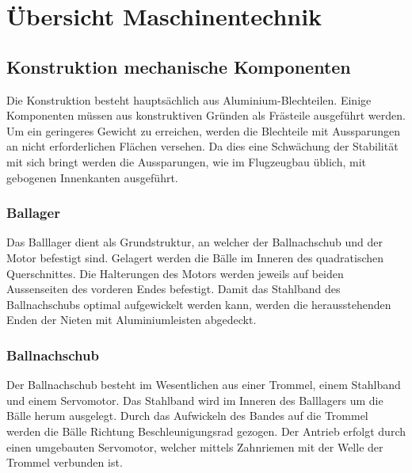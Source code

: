 \section{Übersicht Maschinentechnik}
\subsection{Konstruktion mechanische Komponenten}
Die Konstruktion besteht hauptsächlich aus Aluminium-Blechteilen. Einige 
Komponenten müssen aus konstruktiven Gründen als Frästeile ausgeführt werden.
Um ein geringeres Gewicht zu 
erreichen, werden die Blechteile mit Aussparungen an nicht erforderlichen 
Flächen versehen. Da dies eine Schwächung der Stabilität mit sich bringt werden die Aussparungen, wie im Flugzeugbau üblich, mit gebogenen Innenkanten ausgeführt. 

\subsubsection{Ballager}
Das Balllager dient als Grundstruktur, an welcher der Ballnachschub und der Motor befestigt sind. Gelagert werden die Bälle im Inneren des quadratischen Querschnittes. Die Halterungen des Motors werden jeweils auf beiden Aussenseiten des vorderen Endes befestigt. Damit das Stahlband des Ballnachschubs optimal aufgewickelt werden kann, werden die herausstehenden Enden der Nieten mit Aluminiumleisten abgedeckt.

\subsubsection{Ballnachschub}
Der Ballnachschub besteht im Wesentlichen aus einer Trommel, einem Stahlband und einem Servomotor. Das Stahlband wird im Inneren des Balllagers um die Bälle herum ausgelegt. Durch das Aufwickeln des Bandes auf die Trommel werden die Bälle Richtung Beschleunigungsrad gezogen. Der Antrieb erfolgt durch einen umgebauten Servomotor, welcher mittels Zahnriemen mit der Welle der Trommel verbunden ist.
